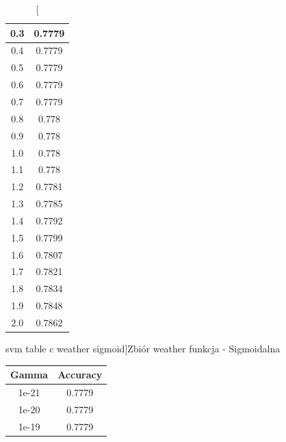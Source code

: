 \documentclass{classrep}
\begin{document}
{{\begin{table}[!htbp]
\begin{minipage}{.3\textwidth}
\begin{tabular}{|c|c|}
                        0.3 & 0.7779 \\ \hline
                        0.4 & 0.7779 \\ \hline
                        0.5 & 0.7779 \\ \hline
                        0.6 & 0.7779 \\ \hline
                        0.7 & 0.7779 \\ \hline
                        0.8 & 0.778 \\ \hline
                        0.9 & 0.778 \\ \hline
                        1.0 & 0.778 \\ \hline
                        1.1 & 0.778 \\ \hline
                        1.2 & 0.7781 \\ \hline
                        1.3 & 0.7785 \\ \hline
                        1.4 & 0.7792 \\ \hline
                        1.5 & 0.7799 \\ \hline
                        1.6 & 0.7807 \\ \hline
                        1.7 & 0.7821 \\ \hline
                        1.8 & 0.7834 \\ \hline
                        1.9 & 0.7848 \\ \hline
                        2.0 & 0.7862 \\ \hline
                    \end{tabular}
                    \caption
                    [svm table c weather sigmoid]{Zbiór weather funkcja - Sigmoidalna}
                    \label{svm_table_c_weather_sigmoid}
                \end{minipage}
            \end{table}
            \FloatBarrier
            \begin{table}[!htbp]
                \begin{minipage}{.35\textwidth}
                    \centering
                    \begin{tabular}{|c|c|}
                        \hline
                        Gamma & Accuracy \\ \hline
                        1e-21 & 0.7779 \\ \hline
                        1e-20 & 0.7779 \\ \hline
                        1e-19 & 0.7779 \\ \hline

\end{tabular}
\end{minipage}
\end{table}}}
\end{document}
